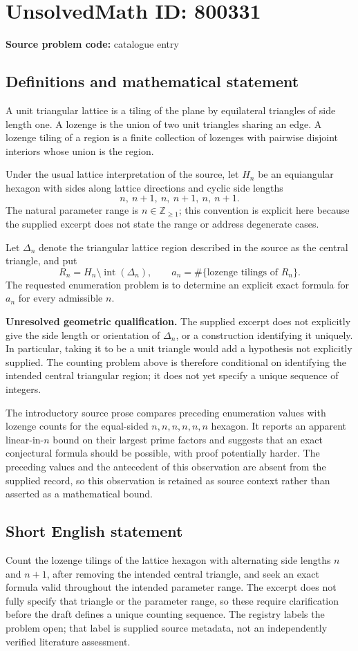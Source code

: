 \documentclass[11pt]{article}
\newcommand{\Z}{\mathbb{Z}}
\begin{document}
\section*{UnsolvedMath ID: 800331}
\textbf{Source problem code:} catalogue entry
\subsection{Definitions and mathematical statement}
A unit triangular lattice is a tiling of the plane by equilateral triangles of side length one. A lozenge is the union of two unit triangles sharing an edge. A lozenge tiling of a region is a finite collection of lozenges with pairwise disjoint interiors whose union is the region.

Under the usual lattice interpretation of the source, let \(H_n\) be an equiangular hexagon with sides along lattice directions and cyclic side lengths
\[
 n,\ n+1,\ n,\ n+1,\ n,\ n+1.
\]
The natural parameter range is \(n\in\Z_{\geq 1}\); this convention is explicit here because the supplied excerpt does not state the range or address degenerate cases.

Let \(\Delta_n\) denote the triangular lattice region described in the source as the central triangle, and put
\[
 R_n=H_n\setminus\operatorname{int}(\Delta_n),\qquad
 a_n=\#\{\text{lozenge tilings of }R_n\}.
\]
The requested enumeration problem is to determine an explicit exact formula for \(a_n\) for every admissible \(n\).

\textbf{Unresolved geometric qualification.} The supplied excerpt does not explicitly give the side length or orientation of \(\Delta_n\), or a construction identifying it uniquely. In particular, taking it to be a unit triangle would add a hypothesis not explicitly supplied. The counting problem above is therefore conditional on identifying the intended central triangular region; it does not yet specify a unique sequence of integers.

The introductory source prose compares preceding enumeration values with lozenge counts for the equal-sided \(n,n,n,n,n,n\) hexagon. It reports an apparent linear-in-\(n\) bound on their largest prime factors and suggests that an exact conjectural formula should be possible, with proof potentially harder. The preceding values and the antecedent of this observation are absent from the supplied record, so this observation is retained as source context rather than asserted as a mathematical bound.
\subsection{Short English statement}
Count the lozenge tilings of the lattice hexagon with alternating side lengths \(n\) and \(n+1\), after removing the intended central triangle, and seek an exact formula valid throughout the intended parameter range. The excerpt does not fully specify that triangle or the parameter range, so these require clarification before the draft defines a unique counting sequence. The registry labels the problem open; that label is supplied source metadata, not an independently verified literature assessment.
\end{document}
